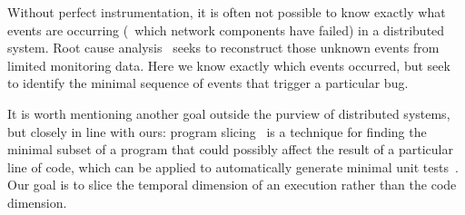 \vspace{0.05in}
 Without perfect instrumentation,
it is often not possible to know exactly what events are occurring (\eg~which
network components have failed) in a
distributed system. Root cause analysis~\cite{yemini1996,Kandula:2009:DDE:1592568.1592597}
seeks to reconstruct those unknown events from limited monitoring data.
Here we know exactly which events occurred, but
seek to identify the minimal sequence of events that trigger a particular bug.

\vspace{0.05in}
It is worth mentioning another goal outside the purview of distributed systems, but
closely in line with ours: program slicing~\cite{weiser1981program} is a
technique for finding the
minimal subset of a program that could possibly affect the result of a particular line of code,
which can be applied to automatically generate minimal unit tests~\cite{burger2011minimizing}.
Our goal is to slice the temporal dimension of an execution rather than the
code dimension.

